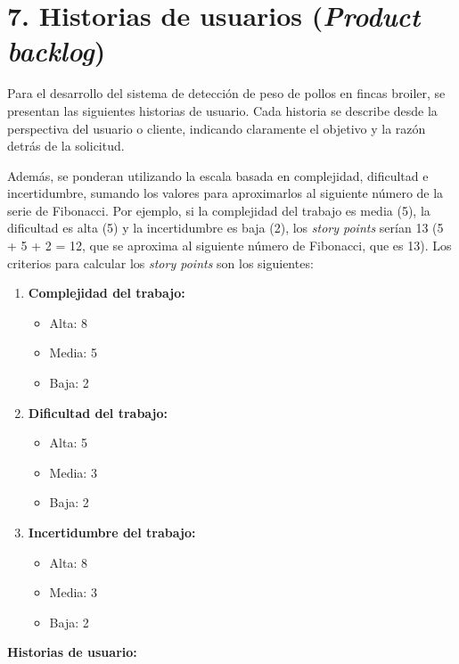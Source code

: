 \documentclass[
11pt, %
]{charter}
\begin{document}
\section{7. Historias de usuarios (\textit{Product backlog})}
\label{sec:backlog}

Para el desarrollo del sistema de detección de peso de pollos en fincas broiler, se presentan las siguientes historias de usuario. Cada historia se describe desde la perspectiva del usuario o cliente, indicando claramente el objetivo y la razón detrás de la solicitud.

Además, se ponderan utilizando la escala basada en complejidad, dificultad e incertidumbre, sumando los valores para aproximarlos al siguiente número de la serie de Fibonacci. Por ejemplo, si la complejidad del trabajo es media (5), la dificultad es alta (5) y la incertidumbre es baja (2), los \textit{story points} serían 13 (5 + 5 + 2 = 12, que se aproxima al siguiente número de Fibonacci, que es 13). Los criterios para calcular los \textit{story points} son los siguientes:

\begin{enumerate}
	\item \textbf{Complejidad del trabajo:}
	\begin{itemize}
		\item Alta: 8
		\item Media: 5
		\item Baja: 2
	\end{itemize}
	\item \textbf{Dificultad del trabajo:}
	\begin{itemize}
		\item Alta: 5
		\item Media: 3
		\item Baja: 2
	\end{itemize}
	\item \textbf{Incertidumbre del trabajo:}
	\begin{itemize}
		\item Alta: 8
		\item Media: 3
		\item Baja: 2
	\end{itemize}
\end{enumerate}

\textbf{Historias de usuario:}
\end{document}
